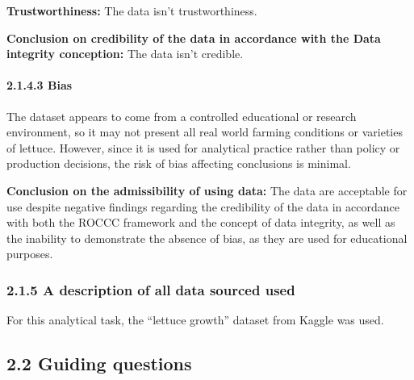 \documentclass[
]{article}
\begin{document}
\textbf{Trustworthiness:} The data isn't trustworthiness.

\textbf{Conclusion on credibility of the data in accordance with the
Data integrity conception:} The data isn't credible.

\paragraph{2.1.4.3 Bias}\label{bias}

The dataset appears to come from a controlled educational or research
environment, so it may not present all real world farming conditions or
varieties of lettuce. However, since it is used for analytical practice
rather than policy or production decisions, the risk of bias affecting
conclusions is minimal.

\textbf{Conclusion on the admissibility of using data:} The data are
acceptable for use despite negative findings regarding the credibility
of the data in accordance with both the ROCCC framework and the concept
of data integrity, as well as the inability to demonstrate the absence
of bias, as they are used for educational purposes.

\subsubsection{2.1.5 A description of all data sourced
used}\label{a-description-of-all-data-sourced-used}

For this analytical task, the ``lettuce growth'' dataset from Kaggle was
used.

\subsection{2.2 Guiding questions}\label{guiding-questions-1}
\end{document}
